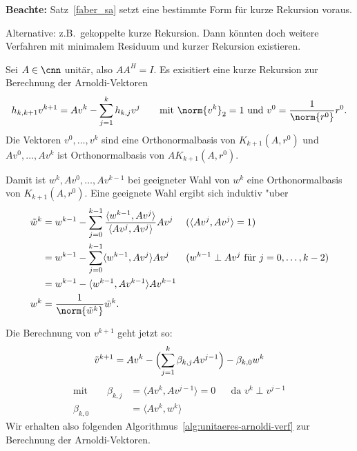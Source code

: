 
\textbf{Beachte:} Satz~\ref{faber_sa} setzt eine bestimmte Form f\"ur kurze
Rekursion voraus.

Alternative: z.B.~gekoppelte kurze Rekursion. Dann k\"onnten doch weitere
Verfahren mit minimalem Residuum und kurzer Rekursion existieren.

\begin{bsp}
  Sei $A\in\cnn$ unit\"ar, also $AA^H=I$. Es exisitiert eine kurze Rekursion
  zur Berechnung der Arnoldi-Vektoren
  \begin{equation*}
    h_{k,k+1}v^{k+1} = Av^k-\sum_{j=1}^{k}h_{k,j}v^j
    \qquad
    \text{mit }
    \norm{v^k}_2=1
    \text{ und }
    v^0=\frac{1}{\norm{r^0}}r^0.
  \end{equation*}
Die Vektoren
  $v^0,\dots,v^k$ sind eine Orthonormalbasis von $K_{k+1}(A,r^0)$ und
  {$Av^0,\dots,Av^k$} ist Orthonormalbasis von $AK_{k+1}(A,r^0)$.

  Damit ist $w^k,Av^0,\dots,Av^{k-1}$ bei geeigneter Wahl von $w^k$ eine
  Orthonormalbasis von $K_{k+1}(A,r^0)$.
  Eine geeignete Wahl ergibt sich induktiv "uber
  \begin{align*}
    \tilde w^k
    &= w^{k-1} - \sum_{j=0}^{k-1}
    \frac {\langle w^{k-1},Av^j\rangle} {\langle Av^j,Av^j\rangle} Av^j
    && (\langle Av^j,Av^j\rangle = 1)
    \\
    &= w^{k-1} - \sum_{j=0}^{k-1} \langle w^{k-1},Av^j\rangle Av^j
    && (w^{k-1}\perp Av^j \text{ f\"ur } j=0,\dots,k-2)
    \\
    &= w^{k-1} - \langle w^{k-1},Av^{k-1}\rangle Av^{k-1}
    &&
    \\
    w^k
    &= \frac{1}{\norm{\tilde w^k}}\tilde w^k
    .
    &&
  \end{align*}

  Die Berechnung von $v^{k+1}$ geht jetzt so:
  \begin{equation*}
    \tilde v^{k+1} = Av^k -\Bigl(\sum_{j=1}^{k}\beta_{k,j}Av^{j-1}\Bigr)
    - \beta_{k,0}w^k
  \end{equation*}
  \begin{align*}
    \text{mit}\qquad
    \beta_{k,j}
    &= \langle Av^k, Av^{j-1}\rangle = 0
    &&\text{da } v^k\perp v^{j-1}
    \\
    \beta_{k,0}
    &=
    \langle Av^k, w^k\rangle
    &&
  \end{align*}
  Wir erhalten also folgenden Algorithmus~\ref{alg:unitaeres-arnoldi-verf}
  zur Berechnung der Arnoldi-Vektoren.


\end{bsp}
